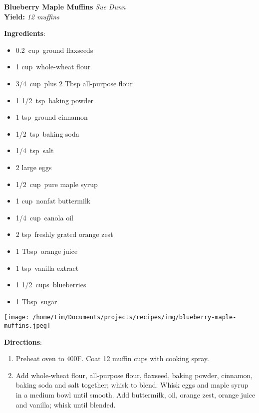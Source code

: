 \documentclass[11pt, twoside, openany]{book}
\begin{document}
\noindent\begin{minipage}[t]{\linewidth}%
{\Large\textbf{Blueberry Maple Muffins}} \label{blueberry-maple-muffins}\hfill\textit{Sue Dunn}\\
\textbf{Yield:} \textit{12 muffins}\\
\noindent\begin{minipage}[t]{0.78\linewidth}%
\textbf{Ingredients}:\vspace{-3mm}
\begin{multicols}{2}
\begin{itemize}\setlength\itemsep{-1mm}
\item 0.2 cup ground flaxseeds
\item 1 cup whole-wheat flour
\item 3/4 cup plus 2 Tbsp all-purpose flour
\item 1 1/2 tsp baking powder
\item 1 tsp ground cinnamon
\item 1/2 tsp baking soda
\item 1/4 tsp salt
\item 2 large eggs
\item 1/2 cup pure maple syrup
\item 1 cup nonfat buttermilk
\item 1/4 cup canola oil
\item 2 tsp freshly grated orange zest
\item 1 Tbsp orange juice
\item 1 tsp vanilla extract
\item 1 1/2 cups blueberries
\item 1 Tbsp sugar
\end{itemize}
\end{multicols}
\end{minipage}
\noindent\begin{minipage}[t]{0.18\linewidth}
\centering \strut\vspace*{-\baselineskip}\newline
\texttt{[image: /home/tim/Documents/projects/recipes/img/blueberry-maple-muffins.jpeg]}\\
\end{minipage}\vspace{3mm}
\textbf{Directions}:
\vspace{-3mm}\begin{enumerate}\setlength\itemsep{-1mm}
\item Preheat oven to 400F. Coat 12 muffin cups with cooking spray.
\item Add whole-wheat flour, all-purpose flour, flaxseed, baking powder, cinnamon, baking soda and salt together; whisk to blend. Whisk eggs and maple syrup in a medium bowl until smooth. Add buttermilk, oil, orange zest, orange juice and vanilla; whisk until blended.

\end{enumerate}
\end{minipage}
\end{document}
